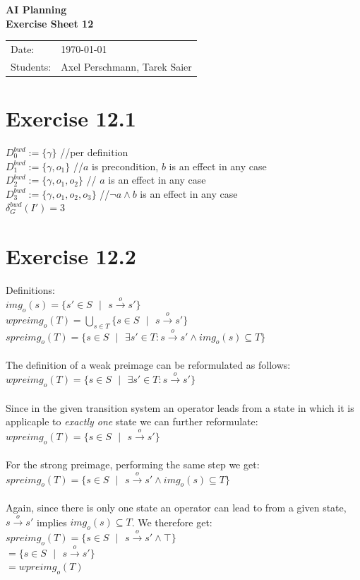 \documentclass[11pt,a4paper]{article}
\newcommand{\sheetNr}{12}
\begin{document}
\begin{center}
\Huge{\textbf{AI Planning}}\\
\LARGE{\textbf{Exercise Sheet \sheetNr}}
\end{center}
\vspace{2cm}
\begin{tabular}{ll}
Date: & \today\\
Students: & Axel Perschmann, Tarek Saier
\end{tabular}

\section*{Exercise 12.1}
$D^{bwd}_0:=\{\gamma\}$ \hphantom{tabtab} //per definition\\
$D^{bwd}_1:=\{\gamma,o_1\}$ \hphantom{tabtab} //$a$ is precondition, $b$ is an effect in any case\\
$D^{bwd}_2:=\{\gamma,o_1,o_2\}$ \hphantom{tabtab} // $a$ is an effect in any case\\
$D^{bwd}_3:=\{\gamma,o_1,o_2,o_3\}$ \hphantom{tabtab} //$\neg a\land b$ is an effect in any case\\
$\delta^{bwd}_G(I')=3$

\section*{Exercise 12.2}
Definitions:\\
$img_o(s)=\{s'\in S\text{ }|\text{ }s\stackrel{o}{\to}s'\}$\\
$wpreimg_o(T)=\bigcup_{s\in T}\{s\in S\text{ }|\text{ }s\stackrel{o}{\to}s'\}$\\
$spreimg_o(T)=\{s\in S\text{ }|\text{ }\exists s'\in T:s\stackrel{o}{\to}s'\land img_o(s)\subseteq T\}$\\
\\
The definition of a weak preimage can be reformulated as follows:\\
$wpreimg_o(T)=\{s\in S\text{ }|\text{ }\exists s'\in T:s\stackrel{o}{\to}s'\}$\\
\\
Since in the given transition system an operator leads from a state in which it is applicaple to \emph{exactly one} state we can further reformulate:\\
$wpreimg_o(T)=\{s\in S\text{ }|\text{ }s\stackrel{o}{\to}s'\}$\\
\\
For the strong preimage, performing the same step we get:\\
$spreimg_o(T)=\{s\in S\text{ }|\text{ }s\stackrel{o}{\to}s'\land img_o(s)\subseteq T\}$\\
\\
Again, since there is only one state an operator can lead to from a given state, $s\stackrel{o}{\to}s'$ implies $img_o(s)\subseteq T$. We therefore get:\\
$spreimg_o(T)=\{s\in S\text{ }|\text{ }s\stackrel{o}{\to}s'\land \top\}$\\
\hphantom{tabtabtabtab}$=\{s\in S\text{ }|\text{ }s\stackrel{o}{\to}s'\}$\\
\hphantom{tabtabtabtab}$=wpreimg_o(T)$\\
\end{document}
